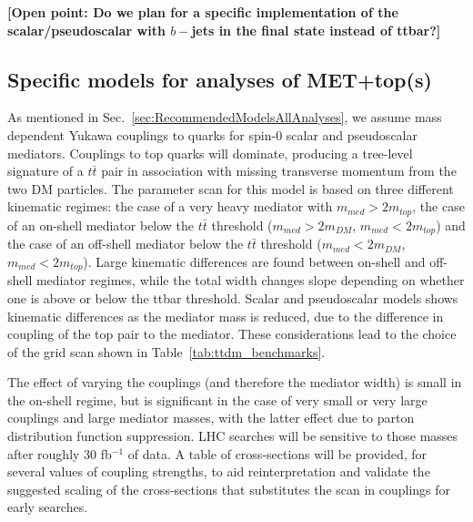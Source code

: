 \documentclass[a4,debug,notitlepage,nobib]{tufte-handout}
\begin{document}
\textbf{[Open point: Do we plan for a specific implementation of the scalar/pseudoscalar
with $b-$jets in the final state instead of ttbar?]}

\subsection{Specific models for analyses of MET+top(s)}
\label{sub:SPttbar}


As mentioned in Sec.~\ref{sec:RecommendedModelsAllAnalyses}, we assume 
mass dependent Yukawa couplings to quarks for spin-$0$ scalar
and pseudoscalar mediators. Couplings to top quarks will dominate, 
producing a tree-level signature of a $t \bar{t}$ pair
in association with missing transverse momentum from the two DM particles.
The parameter scan for this model is based on three different kinematic
regimes: the case of a very heavy mediator with $m_{med} > 2 m_{top}$, 
the case of an on-shell mediator below the $t\bar{t}$ threshold ($m_{med} > 2 m_{DM}$, 
$m_{med} < 2 m_{top}$) and the case of an off-shell mediator below
the $t\bar{t}$ threshold ($m_{med} < 2 m_{DM}$, $m_{med} < 2 m_{top}$). 
Large kinematic differences are found between on-shell and off-shell mediator
regimes, while the total width changes slope depending on whether one
is above or below the ttbar threshold. 
Scalar and pseudoscalar models shows kinematic differences as the mediator mass 
is reduced, due to the difference in coupling of the top pair to the mediator. 
These considerations lead to the choice of the grid scan shown in 
Table~\ref{tab:ttdm_benchmarks}.

The effect of varying the couplings (and therefore the mediator width) 
is small in the on-shell regime, but is significant in the case of
very small or very large couplings and large mediator masses, 
with the latter effect due to parton distribution function suppression. 
LHC searches will be sensitive to those masses after roughly 30 fb$^{-1}$ of data. 
A table of cross-sections will be provided, for several values of coupling strengths,
to aid reinterpretation and validate the suggested scaling of the cross-sections
that substitutes the scan in couplings for early searches. 
\end{document}

